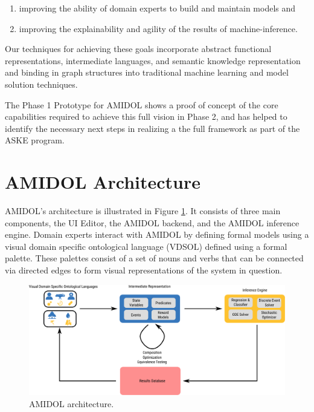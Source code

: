 \documentclass[11pt]{article}
\newcommand{\amidol}{\textsc{AMIDOL}}
\begin{document}
\begin{enumerate}
\item improving the ability of domain experts to build and maintain models and
\item improving the explainability and agility of the results of machine-inference.
\end{enumerate}

Our techniques for achieving these goals incorporate abstract functional representations, intermediate languages, and semantic knowledge representation and binding in graph structures into traditional machine learning and model solution techniques.

The Phase 1 Prototype for \amidol{} shows a proof of concept of the core capabilities required to achieve this full vision in Phase 2, and has helped to identify the necessary next steps in realizing a the full framework as part of the ASKE program.

\section{\amidol{} Architecture}

\amidol{}'s architecture is illustrated in Figure \ref{Fig:AMIDOLArch}.  It consists of three main components, the UI Editor, the \amidol{} backend, and the \amidol{} inference engine.  Domain experts interact with \amidol{} by defining formal models using a visual domain specific ontological language (VDSOL) defined using a formal palette.  These palettes consist of a set of nouns and verbs that can be connected via directed edges to form visual representations of the system in question.

\begin{figure}
  \includegraphics[width=\textwidth]{figs/system-architecture.pdf}
  \caption{\amidol{} architecture.}
  \label{Fig:AMIDOLArch}
\end{figure}
\end{document}
